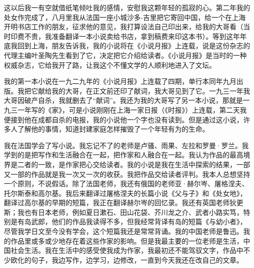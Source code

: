 \par 这以后我一有空就借纸笔倾吐我的感情，安慰我这颗年轻的孤寂的心。第二年我的处女作完成了，八月里我从法国一座小城沙多-吉里把它寄回中国，给一个在上海开明书店工作的朋友，征求他的意见，我打算设法自己印出来，给我的大哥看（当时印费不贵，我准备翻译一本小说卖给书店，拿到稿费来印这本书）。等到这年年底我回到上海，朋友告诉我，我的小说将在《小说月报》上连载，说是这份杂志的代理主编叶圣陶先生看到了它，决定把它介绍给读者。《小说月报》是当时的一种权威杂志，它给我开了路，让我这个不懂文学的人顺利地进入了文坛。
\par 我的第一本小说在一九二九年的《小说月报》上连载了四期，单行本同年九月出版。我把它献给我的大哥，在正文前还印了献词，我大哥见到了它。一九三一年我大哥因破产自杀，我就删去了“献词”。我还为我的大哥写了另一本小说，那就是一九三一年写的《家》，可是小说刚刚在上海一家日报（《时报》）上连载，第二天我便接到他在成都自杀的电报，我的小说他一个字也没有读到。但是通过这小说，许多人了解他的事情，知道封建家庭怎样摧毁了一个年轻有为的生命。
\par 我在法国学会了写小说。我忘记不了的老师是卢骚、雨果、左拉和罗曼·罗兰。我学到的是把写作和生活融合在一起，把作家和人融合在一起。我认为作品的最高境界是二者的一致，是作家把心交给读者。我的小说是我在生活中探索的结果，一部又一部的作品就是我一次又一次的收获。我把作品交给读者评判。我本人总想坚持一个原则，不说假话。除了法国老师，我还有俄国的老师亚·赫尔岑、屠格涅夫、托尔斯泰和高尔基。我后来翻译过屠格涅夫的长篇小说《父与子》和《处女地》，翻译过高尔基的早期的短篇，我正在翻译赫尔岑的回忆录。我还有英国老师狄更斯；我也有日本老师，例如夏日漱石、田山花袋、芥川龙之介、武者小路实笃，特别是有岛武郎，他们的作品我读得不多，但我经常背译有岛的短篇《与幼小者》，尽管我学日文至今没有学会，这个短篇我还是常常背诵。我的中国老师是鲁迅。我的作品里或多或少地存在着这些作家的影响。但是我最主要的一位老师是生活，中国社会生活。我在生活中的感受使我成为作家，我最初还不能驾驭文字，作品中不少欧化的句子，我边写作，边学习，边修改，一直到今天我还在改自己的文章。
